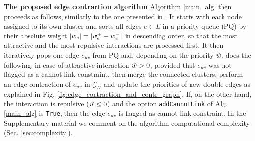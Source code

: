 \textbf{The proposed edge contraction algorithm } Algorithm \ref{main_alg} then proceeds as follows, similarly to the one presented in \cite{levinkov2017comparative}. It starts with each node assigned to its own cluster and sorts all edges $e\in E$ in a priority queue (PQ) by their absolute weight $|w_e|=|w_e^+ - w_e^-|$ in descending order, so that the most attractive and the most repulsive interactions are processed first. It then iteratively pops one edge $e_{uv}$ from PQ and, depending on the priority $\tilde{w}$, does the following: in case of attractive interaction $\tilde{w}>0$, provided that $e_{uv}$ was not flagged as a cannot-link constraint, then merge the connected clusters, perform an edge contraction of $e_{uv}$ in $\tilde{\mathcal{G}}_\Pi$ and update the priorities of new double edges as explained in Fig. \ref{fig:edge_contraction_and_contr_graph}. 
If, on the other hand, the interaction is repulsive ($\tilde{w}\leq 0$) and the option \texttt{addCannotLink} of Alg. \ref{main_alg} is \texttt{True}, then the edge $e_{uv}$ is flagged as cannot-link constraint.
In the Supplementary material we comment on the algorithm computational complexity (Sec. \ref{sec:complexity}).



